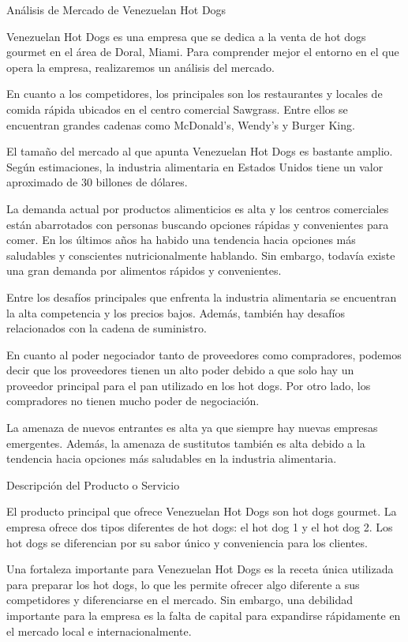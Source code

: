 Análisis de Mercado de Venezuelan Hot Dogs

Venezuelan Hot Dogs es una empresa que se dedica a la venta de hot dogs gourmet en el área de Doral, Miami. Para comprender mejor el entorno en el que opera la empresa, realizaremos un análisis del mercado.

En cuanto a los competidores, los principales son los restaurantes y locales de comida rápida ubicados en el centro comercial Sawgrass. Entre ellos se encuentran grandes cadenas como McDonald's, Wendy's y Burger King.

El tamaño del mercado al que apunta Venezuelan Hot Dogs es bastante amplio. Según estimaciones, la industria alimentaria en Estados Unidos tiene un valor aproximado de 30 billones de dólares.

La demanda actual por productos alimenticios es alta y los centros comerciales están abarrotados con personas buscando opciones rápidas y convenientes para comer. En los últimos años ha habido una tendencia hacia opciones más saludables y conscientes nutricionalmente hablando. Sin embargo, todavía existe una gran demanda por alimentos rápidos y convenientes.

Entre los desafíos principales que enfrenta la industria alimentaria se encuentran la alta competencia y los precios bajos. Además, también hay desafíos relacionados con la cadena de suministro.

En cuanto al poder negociador tanto de proveedores como compradores, podemos decir que los proveedores tienen un alto poder debido a que solo hay un proveedor principal para el pan utilizado en los hot dogs. Por otro lado, los compradores no tienen mucho poder de negociación.

La amenaza de nuevos entrantes es alta ya que siempre hay nuevas empresas emergentes. Además, la amenaza de sustitutos también es alta debido a la tendencia hacia opciones más saludables en la industria alimentaria.

Descripción del Producto o Servicio

El producto principal que ofrece Venezuelan Hot Dogs son hot dogs gourmet. La empresa ofrece dos tipos diferentes de hot dogs: el hot dog 1 y el hot dog 2. Los hot dogs se diferencian por su sabor único y conveniencia para los clientes.

Una fortaleza importante para Venezuelan Hot Dogs es la receta única utilizada para preparar los hot dogs, lo que les permite ofrecer algo diferente a sus competidores y diferenciarse en el mercado. Sin embargo, una debilidad importante para la empresa es la falta de capital para expandirse rápidamente en el mercado local e internacionalmente.

